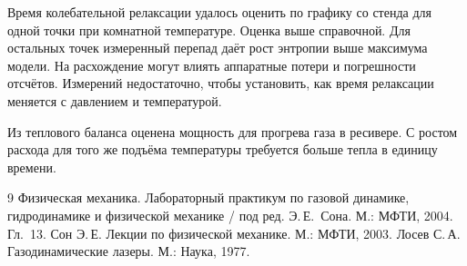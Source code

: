 \documentclass[12pt,a4paper]{article}
\begin{document}
Время колебательной релаксации удалось оценить по графику со стенда
для одной точки при комнатной температуре. Оценка выше справочной.
Для остальных точек измеренный перепад даёт рост энтропии выше
максимума модели. На расхождение могут влиять аппаратные потери
и погрешности отсчётов. Измерений недостаточно, чтобы установить,
как время релаксации меняется с давлением и температурой.

Из теплового баланса оценена мощность для прогрева газа в ресивере.
С ростом расхода для того же подъёма температуры требуется больше тепла
в единицу времени.

\begin{thebibliography}{9}
 Физическая механика. Лабораторный практикум по газовой
    динамике, гидродинамике и физической механике / под ред.
    Э.\,Е.~Сона. М.: МФТИ, 2004. Гл.~13.
 Сон Э.\,Е. Лекции по физической механике. М.: МФТИ, 2003.
 Лосев С.\,А. Газодинамические лазеры. М.: Наука, 1977.
\end{thebibliography}
\end{document}

